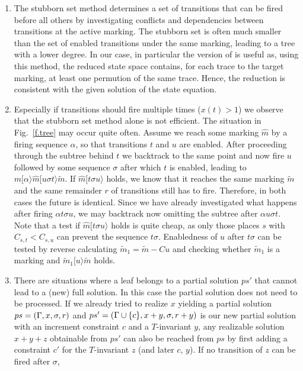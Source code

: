 \documentclass{LMCS}
\newcommand{\step}[1]{[#1\rangle}
\newcommand{\I}{C} \newcommand{\C}{{\ensuremath \Gamma}} \newcommand{\ord}{\ensuremath{\Omega}}
\begin{document}
\begin{enumerate}[(1)]
\item The stubborn set method \cite{ksv06} determines a set of transitions that can be fired before all others by
investigating conflicts and dependencies between transitions at the active marking. The stubborn set is often much smaller than
the set of enabled transitions under the same marking, leading to a tree with a lower degree. In our case, in particular the version
of \cite{schmidt_atpn99} is useful as, using this method, the reduced state space contains, for each trace to the target marking,
at least one permution of the same trace. Hence, the reduction is consistent with the given solution of the state equation.
\item Especially if transitions should fire multiple times ($x(t)>1$) we observe that the stubborn set
method alone is not efficient. The situation in Fig.~\ref{f.tree} may occur quite often. Assume we reach some marking
$\hat{m}$ by a firing sequence $\alpha$, so that transitions $t$ and $u$ are enabled. After proceeding through the
subtree behind $t$ we backtrack to the same point and now fire $u$ followed by some sequence $\sigma$ after which $t$
is enabled, leading to $m\step{\alpha}\hat{m}\step{u\sigma t}\widetilde{m}$. If $\hat{m}\step{t\sigma u}$ holds, we know that
it reaches the same marking $\widetilde{m}$ and the same remainder $r$ of transitions still has to fire. Therefore, in
both cases the future is identical. Since we have already investigated what happens after firing $\alpha t\sigma u$,
we may backtrack now omitting the subtree after $\alpha u\sigma t$. Note that a test if $\hat{m}\step{t\sigma u}$ holds
is quite cheap, as only those places $s$ with $\I_{s,t}<\I_{s,u}$ can prevent the sequence $t\sigma$.
Enabledness of $u$ after $t\sigma$ can be tested by reverse calculating $\widetilde{m}_1=\widetilde{m}-\I u$ and 
checking whether $\widetilde{m}_1$ is a marking and $\widetilde{m}_1\step{u}\widetilde{m}$ holds. 
\item There are situations where a leaf belongs to a partial solution $ps'$ that cannot lead to a (new) full solution. In this
case the partial solution does not need to be processed. If we already tried to realize $x$ yielding a partial solution
$ps=(\C,x,\sigma,r)$ and $ps'=(\C\cup\{c\},x+y,\sigma,r+y)$ is our new partial solution with an increment constraint $c$
and a $T$-invariant $y$, any realizable solution $x+y+z$ obtainable from $ps'$ can also be reached from $ps$ by first
adding a constraint $c'$ for the $T$-invariant $z$ (and later $c$, $y$). If no transition of $z$ can be fired after $\sigma$,

\end{enumerate}
\end{document}
